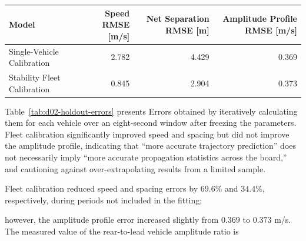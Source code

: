 \documentclass[11pt,a4paper,openany]{book}
\numberwithin{equation}{chapter}
\numberwithin{figure}{chapter}
\numberwithin{table}{chapter}
\newcommand{\tabletext}[2]{%
  \par\smallskip\noindent
  Table~\ref{#1} presents #2
\par\smallskip
}
\begin{document}
\begin{center}
\small
{}
\label{tab:d02-holdout-errors}
\begin{tabular}{p{3.7cm}rrr}
\toprule
\textbf{Model} &




 Speed RMSE [m/s]




&




 Net Separation RMSE [m]




&




Amplitude Profile RMSE [m/s]



\\
\midrule







Single-Vehicle Calibration




& 2.782 & 4.429 & 0.369\\







Stability Fleet Calibration& 0.845 & 2.904 & 0.373\\
\bottomrule
\end{tabular}
\end{center}
\tabletext{tab:d02-holdout-errors}{Errors obtained by iteratively calculating them for each vehicle over an eight-second window after freezing the parameters. Fleet calibration significantly improved speed and spacing but did not improve the amplitude profile, indicating that “more accurate trajectory prediction” does not necessarily imply “more accurate propagation statistics across the board,” and cautioning against over-extrapolating results from a limited sample.
}







Fleet calibration reduced speed and spacing errors by $69.6\%$ and $34.4\%$, respectively, during periods not included in the fitting;

however, the amplitude profile error increased slightly from $0.369$ to $0.373$ m/s. The measured value of the rear-to-lead vehicle amplitude ratio is
\end{document}

